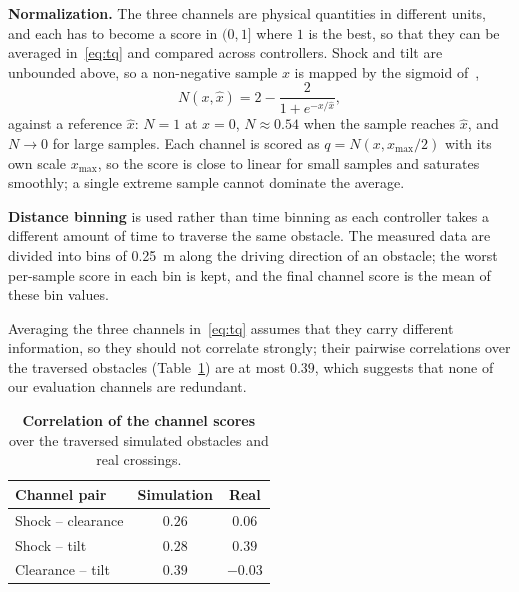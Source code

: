 \noindent\textbf{Normalization.} The three channels are physical quantities in different
units, and each has to become a score in $(0,1]$ where $1$ is the best, so that they can be
averaged in~\eqref{eq:tq} and compared across controllers. Shock and tilt are unbounded above, so a non-negative sample $x$ is
mapped by the sigmoid of~\cite{cihala2025},
\begin{equation}
  N(x,\hat{x}) = 2 - \frac{2}{1 + e^{-x/\hat{x}}},
  \label{eq:norm}
\end{equation}
against a reference $\hat{x}$: $N=1$ at $x=0$, $N\approx0.54$ when the sample reaches
$\hat{x}$, and $N\to0$ for large samples. Each channel is scored as $q=N(x,x_{\max}/2)$ with
its own scale $x_{\max}$, so the score is close to linear for small samples and saturates
smoothly; a single extreme sample cannot dominate the average. 

\noindent\textbf{Distance binning} is used rather than time binning 
as each controller takes a different amount of time to traverse the same obstacle. The measured data are divided into bins of \SI{0.25}{\metre}
along the driving direction of an obstacle; the worst per-sample score in each bin is kept, and the final
channel score is the mean of these bin values. 

Averaging the three channels in~\eqref{eq:tq} assumes that they carry different
information, so they should not correlate strongly; their pairwise correlations
over the traversed obstacles (Table~\ref{tab:spearman}) are at most $0.39$, which suggests that none of our evaluation channels are redundant.

\begin{table}[t]
\centering
\caption{\textbf{Correlation of the channel scores} over the traversed simulated
obstacles and real crossings.}
\label{tab:spearman}
\footnotesize
\begin{tabular}{@{}lcc@{}}
\toprule
Channel pair & Simulation & Real \\
\midrule
Shock -- clearance & $0.26$ & $0.06$ \\
Shock -- tilt & $0.28$ & $0.39$ \\
Clearance -- tilt & $0.39$ & $-0.03$ \\
\bottomrule
\end{tabular}
\end{table}

